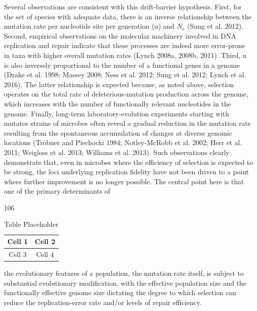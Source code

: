 \documentclass{article}
\begin{document}
Several observations are consistent with this drift-barrier hypothesis. First, for the set of species with adequate data, there is an inverse relationship between the mutation rate per nucleotide site per generation (u) and  $ N_{e} $ (Sung et al. 2012). Second, empirical observations on the molecular machinery involved in DNA replication and repair indicate that these processes are indeed more error-prone in taxa with higher overall mutation rates (Lynch 2008a, 2008b, 2011). Third, u is also inversely proportional to the number of a functional genes in a genome (Drake et al. 1998; Massey 2008; Ness et al. 2012; Sung et al. 2012; Lynch et al. 2016). The latter relationship is expected because, as noted above, selection operates on the total rate of deleterious-mutation production across the genome, which increases with the number of functionally relevant nucleotides in the genome. Finally, long-term laboratory-evolution experiments starting with mutator strains of microbes often reveal a gradual reduction in the mutation rate resulting from the spontaneous accumulation of changes at diverse genomic locations (Tröbner and Piechocki 1984; Notley-McRobb et al. 2002; Herr et al. 2011; Weigloss et al. 2013; Williams et al. 2013). Such observations clearly demonstrate that, even in microbes where the efficiency of selection is expected to be strong, the loci underlying replication fidelity have not been driven to a point where further improvement is no longer possible. The central point here is that one of the primary determinants of

106

\begin{table}[h]
\centering
\begin{tabular}{|c|c|}
\hline
Cell 1 & Cell 2 \\
\hline
Cell 3 & Cell 4 \\
\hline
\end{tabular}
\caption{Table Placeholder}
\end{table}

the evolutionary features of a population, the mutation rate itself, is subject to substantial evolutionary modification, with the effective population size and the functionally effective genome size dictating the degree to which selection can reduce the replication-error rate and/or levels of repair efficiency.
\end{document}
